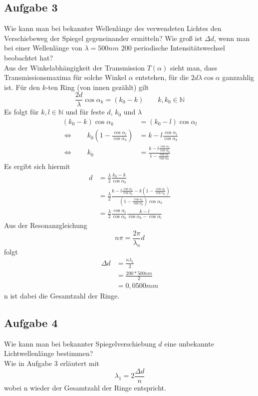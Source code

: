 \documentclass[a4paper,10pt]{scrartcl}
\begin{document}
	\subsection{Aufgabe 3} 
	Wie kann man bei bekannter Wellenlänge des verwendeten Lichtes den Verschiebeweg der Spiegel gegeneinander ermitteln? Wie groß ist $\Delta d$, wenn man bei einer Wellenlänge von $\lambda = 500nm$ $200$ periodische Intensitätswechsel beobachtet hat?\\
	Aus der Winkelabhängigkeit der Transmission $T(\alpha)$ sieht man, dass Transmissionsmaxima für solche
	Winkel $\alpha$ entstehen, für die $2d\lambda\cos\alpha$ ganzzahlig ist. Für den $k$-ten Ring (von innen gezählt) gilt
	\[
	\frac{2d}{\lambda}\cos {\alpha}_k=(k_0-k)\qquad k,k_0\in \mathbb{N}
	\]
	Es folgt für $k,l\in \mathbb{N}$ und für feste $d$, $k_0$ und $\lambda$
	\begin{align*}
	(k_0-k)\cos {\alpha}_k &= (k_0-l)\cos {\alpha}_l \\
	\Leftrightarrow\qquad k_0(1-\frac{{ \cos\alpha}_l}{{\cos\alpha}_k}) &= k-l\frac{{\cos\alpha}_l}{{\cos\alpha}_k} \\
	\Leftrightarrow\qquad k_0 &=\frac{k-l\frac{{\cos\alpha}_l}{{\cos\alpha}_k}}{1-\frac{{ \cos\alpha}_l}{{\cos\alpha}_k}}
	\end{align*}
	Es ergibt sich hiermit
	\begin{align*}
	d &=\frac{\lambda}{2}\frac{k_0-k}{\cos {\alpha}_k}\\
	&=\frac{\lambda}{2}\frac{k-l\frac{{\cos\alpha}_l}{{\cos\alpha}_k}-k(1-\frac{{\cos\alpha}_l}{{\cos\alpha}_k})}{(1-\frac{{\cos\alpha}_l}{{\cos\alpha}_k})\cos{\alpha}_k}\\
	&=\frac{\lambda}{2}\frac{{\cos\alpha}_l}{{\cos\alpha}_k}\frac{k-l}{\cos{\alpha}_k-\cos{\alpha}_l}
	\end{align*}
	Aus der Resonanzgleichung \[ n\pi = \frac{2\pi}{{\lambda}_n}d \] folgt
	\begin{align*}
	\Delta d &= \frac{n {\lambda}_1}{2}
	\\ &=\frac{200*500nm}{2}
	\\ &=0,0500mm
	\end{align*}
	n ist dabei die Gesamtzahl der Ringe.
	\\
	\subsection{Aufgabe 4}
	 Wie kann man bei bekannter Spiegelverschiebung $d$ eine unbekannte Lichtwellenlänge bestimmen?\\
	Wie in Aufgabe 3 erläutert mit
	\[
	{\lambda}_1=2\frac{\Delta d}{n}
	\]
	wobei n wieder der Gesamtzahl der Ringe entspricht. \\
\end{document}
